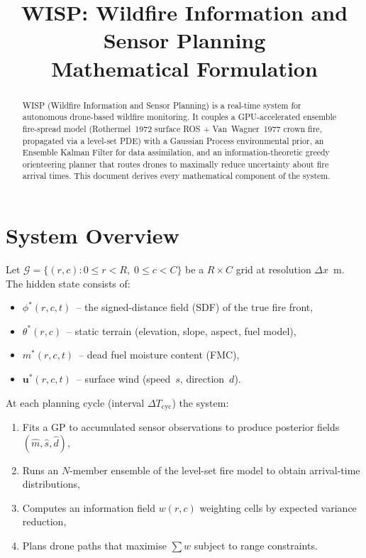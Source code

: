 \documentclass[11pt,twocolumn]{article}
\title{\textbf{WISP: Wildfire Information and Sensor Planning}\\
\large Mathematical Formulation}
\author{}
\date{}
\begin{document}
\maketitle

\begin{abstract}
WISP (Wildfire Information and Sensor Planning) is a real-time
system for autonomous drone-based wildfire monitoring.  It couples a
GPU-accelerated ensemble fire-spread model (Rothermel~1972 surface
ROS + Van~Wagner~1977 crown fire, propagated via a level-set PDE)
with a Gaussian Process environmental prior, an Ensemble Kalman
Filter for data assimilation, and an information-theoretic greedy
orienteering planner that routes drones to maximally reduce
uncertainty about fire arrival times.  This document derives every
mathematical component of the system.
\end{abstract}

\section{System Overview}
\label{sec:overview}

Let $\mathcal{G} = \{(r,c) : 0\le r<R,\; 0\le c<C\}$ be a
$R\times C$ grid at resolution $\Delta x$~m.  The hidden state
consists of:
\begin{itemize}
  \item $\phi^*(r,c,t)$~-- the signed-distance field (SDF) of the
        true fire front,
  \item $\theta^*(r,c)$~-- static terrain (elevation, slope, aspect,
        fuel model),
  \item $m^*(r,c,t)$~-- dead fuel moisture content (FMC),
  \item $\mathbf{u}^*(r,c,t)$~-- surface wind (speed~$s$, direction~$d$).
\end{itemize}

At each planning cycle (interval $\Delta T_{\mathrm{cyc}}$) the
system:
\begin{enumerate}
  \item Fits a GP to accumulated sensor observations to produce
        posterior fields $(\hat{m},\hat{s},\hat{d})$,
  \item Runs an $N$-member ensemble of the level-set fire model to
        obtain arrival-time distributions,
  \item Computes an information field $w(r,c)$ weighting cells by
        expected variance reduction,
  \item Plans drone paths that maximise $\sum w$ subject to range
        constraints.
\end{enumerate}
\end{document}
